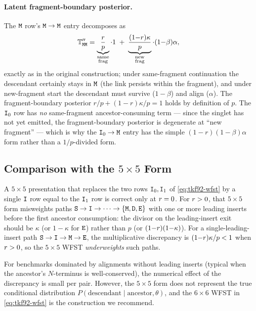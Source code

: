 \paragraph{Latent fragment-boundary posterior.}
The ${\tt M}$ row's ${\tt M}\to{\tt M}$ entry decomposes as
\[
\mathbb{T}''_{{\tt M}{\tt M}}
= \underbrace{\frac{r}{p}}_{\substack{\text{same}\\\text{frag}}} \cdot 1
\;+\;
\underbrace{\frac{(1{-}r)\kappa}{p}}_{\substack{\text{new}\\\text{frag}}} \cdot (1{-}\beta)\alpha,
\]
exactly as in the original construction; under same-fragment
continuation the descendant certainly stays in ${\tt M}$
(the link persists within the fragment), and under new-fragment
start the descendant must survive ($1{-}\beta$) and align ($\alpha$).
The fragment-boundary posterior $r/p + (1{-}r)\kappa/p = 1$ holds by
definition of $p$.  The ${\tt I}_0$ row has \emph{no} same-fragment
ancestor-consuming term --- since the singlet has not yet emitted,
the fragment-boundary posterior is degenerate at ``new fragment'' ---
which is why the ${\tt I}_0\to{\tt M}$ entry has the simple
$(1{-}r)(1{-}\beta)\alpha$ form rather than a $1/p$-divided form.

\subsection{Comparison with the \texorpdfstring{$5{\times}5$}{5x5} Form}
\label{sec:wfst92-vs-5x5}

A $5{\times}5$ presentation that replaces the two rows
${\tt I}_0,{\tt I}_1$ of \eqref{eq:tkf92-wfst} by a single ${\tt I}$ row equal
to the ${\tt I}_1$ row is correct only at $r=0$.  For $r>0$, that
$5{\times}5$ form misweights paths
${\tt S} \to {\tt I} \to \cdots \to \{{\tt M},{\tt D},{\tt E}\}$ with one or more
leading inserts before the first ancestor consumption: the divisor
on the leading-insert exit should be $\kappa$ (or $1{-}\kappa$ for
${\tt E}$) rather than $p$ (or $(1{-}r)(1{-}\kappa)$).
For a single-leading-insert path ${\tt S}\to{\tt I}\to{\tt M}\to{\tt E}$,
the multiplicative discrepancy is
$(1{-}r)\kappa/p < 1$ when $r>0$, so the $5{\times}5$ WFST
\emph{underweights} such paths.

For benchmarks dominated by alignments without leading inserts
(typical when the ancestor's $N$-terminus is well-conserved),
the numerical effect of the discrepancy is small per pair.
However, the $5{\times}5$ form does not represent the true
conditional distribution $P(\text{descendant} \mid \text{ancestor},
\theta)$, and the $6{\times}6$ WFST in \eqref{eq:tkf92-wfst} is
the construction we recommend.

